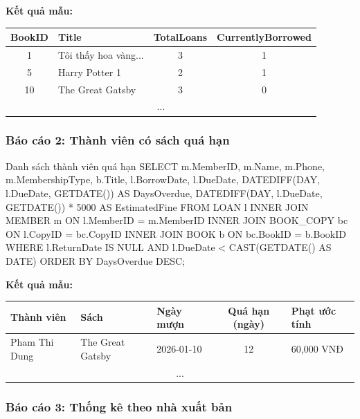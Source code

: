 \documentclass[12pt,a4paper]{article}
\begin{document}
\textbf{Kết quả mẫu:}
\begin{table}[H]
\centering
\begin{tabular}{@{}|c|l|c|c|@{}}
\hline
\textbf{BookID} & \textbf{Title} & \textbf{TotalLoans} & \textbf{CurrentlyBorrowed} \\ \hline
1 & Tôi thấy hoa vàng... & 3 & 1 \\ \hline
5 & Harry Potter 1 & 2 & 1 \\ \hline
10 & The Great Gatsby & 3 & 0 \\ \hline
\multicolumn{4}{|c|}{...} \\ \hline
\end{tabular}
\end{table}

\subsubsection{Báo cáo 2: Thành viên có sách quá hạn}

\begin{sqlcode}{Danh sách thành viên quá hạn}
SELECT
    m.MemberID,
    m.Name,
    m.Phone,
    m.MembershipType,
    b.Title,
    l.BorrowDate,
    l.DueDate,
    DATEDIFF(DAY, l.DueDate, GETDATE()) AS DaysOverdue,
    DATEDIFF(DAY, l.DueDate, GETDATE()) * 5000 AS EstimatedFine
FROM LOAN l
INNER JOIN MEMBER m ON l.MemberID = m.MemberID
INNER JOIN BOOK_COPY bc ON l.CopyID = bc.CopyID
INNER JOIN BOOK b ON bc.BookID = b.BookID
WHERE l.ReturnDate IS NULL
  AND l.DueDate < CAST(GETDATE() AS DATE)
ORDER BY DaysOverdue DESC;
\end{sqlcode}

\textbf{Kết quả mẫu:}
\begin{table}[H]
\centering
\begin{tabular}{@{}|l|l|l|c|@{}}
\hline
\textbf{Thành viên} & \textbf{Sách} & \textbf{Ngày mượn} & \textbf{Quá hạn (ngày)} & \textbf{Phạt ước tính} \\ \hline
Pham Thi Dung & The Great Gatsby & 2026-01-10 & 12 & 60,000 VNĐ \\ \hline
{} \\ \hline
\end{tabular}
\end{table}

\subsubsection{Báo cáo 3: Thống kê theo nhà xuất bản}
\end{document}
